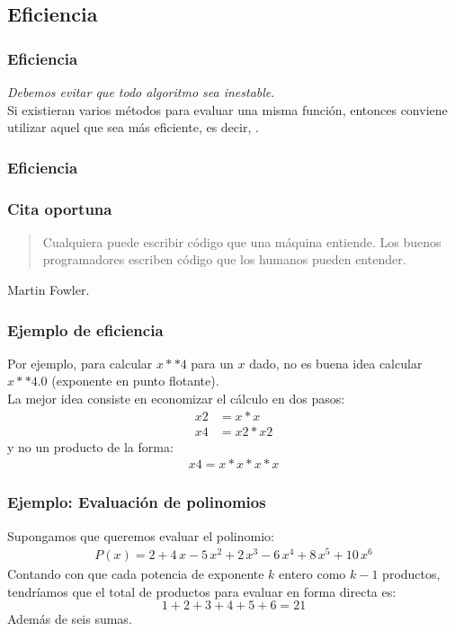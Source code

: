 \documentclass[12pt]{beamer}
\begin{document}
\subsection{Eficiencia}

\begin{frame}
\frametitle{Eficiencia}
\emph{Debemos evitar que todo algoritmo sea inestable}. 
\\
\bigskip
Si existieran varios métodos para evaluar una misma función, entonces conviene utilizar aquel que sea más eficiente, \pause es decir, .
\end{frame}
\begin{frame}
\frametitle{Eficiencia}
\end{frame}
\begin{frame}
\frametitle{Cita oportuna}
\begin{quote}
Cualquiera puede escribir código que una máquina entiende. Los buenos programadores escriben código que los humanos pueden entender.
\end{quote}
Martin Fowler.
\end{frame}
\begin{frame}
\frametitle{Ejemplo de eficiencia}
Por ejemplo, para calcular $x**4$ para un $x$ dado, no es buena idea calcular $x**4.0$ (exponente en punto flotante).
\\
\bigskip
\pause
La mejor idea consiste en economizar el cálculo en dos pasos:
\begin{align*}
x2 &= x*x \\
x4 &= x2*x2
\end{align*}
\pause
y no un producto de la forma:
\begin{align*}
x4 = x*x*x*x
\end{align*}
\end{frame}
\begin{frame}
\frametitle{Ejemplo: Evaluación de polinomios}
Supongamos que queremos evaluar el polinomio:
\pause
\begin{align*}
P (x) = 2 + 4 \, x - 5\, x^{2} + 2\,  x^{3} - 6 \, x^{4} + 8 \, x^{5} + 10 \, x^{6}
\end{align*}
\pause
Contando con que cada potencia de exponente $k$ entero como $k-1$ productos, tendríamos que el total de productos para evaluar en forma directa es:
\[ 1+2+3+4+5+6=21\]
Además de seis sumas.
\end{frame}
\end{document}
